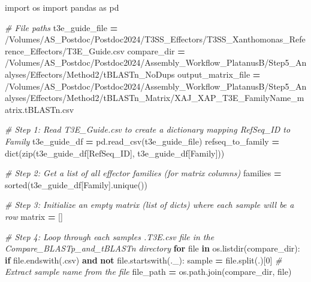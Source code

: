 \documentclass[
]{book}
\newenvironment{Shaded}{\begin{snugshade}}{\end{snugshade}}
\newcommand{\BuiltInTok}[1]{#1}
\newcommand{\CommentTok}[1]{\textcolor[rgb]{0.56,0.35,0.01}{\textit{#1}}}
\newcommand{\ControlFlowTok}[1]{\textcolor[rgb]{0.13,0.29,0.53}{\textbf{#1}}}
\newcommand{\DecValTok}[1]{\textcolor[rgb]{0.00,0.00,0.81}{#1}}
\newcommand{\ImportTok}[1]{#1}
\newcommand{\KeywordTok}[1]{\textcolor[rgb]{0.13,0.29,0.53}{\textbf{#1}}}
\newcommand{\NormalTok}[1]{#1}
\newcommand{\OperatorTok}[1]{\textcolor[rgb]{0.81,0.36,0.00}{\textbf{#1}}}
\newcommand{\StringTok}[1]{\textcolor[rgb]{0.31,0.60,0.02}{#1}}
\begin{document}
\begin{Shaded}
\begin{Highlighting}[]
\ImportTok{import}\NormalTok{ os}
\ImportTok{import}\NormalTok{ pandas }\ImportTok{as}\NormalTok{ pd}

\CommentTok{\# File paths}
\NormalTok{t3e\_guide\_file }\OperatorTok{=} \StringTok{\textquotesingle{}/Volumes/AS\_Postdoc/Postdoc2024/T3SS\_Effectors/T3SS\_Xanthomonas\_Reference\_Effectors/T3E\_Guide.csv\textquotesingle{}}
\NormalTok{compare\_dir }\OperatorTok{=} \StringTok{\textquotesingle{}/Volumes/AS\_Postdoc/Postdoc2024/Assembly\_Workflow\_PlatanusB/Step5\_Analyses/Effectors/Method2/tBLASTn\_NoDups\textquotesingle{}}
\NormalTok{output\_matrix\_file }\OperatorTok{=} \StringTok{\textquotesingle{}/Volumes/AS\_Postdoc/Postdoc2024/Assembly\_Workflow\_PlatanusB/Step5\_Analyses/Effectors/Method2/tBLASTn\_Matrix/XAJ\_XAP\_T3E\_FamilyName\_matrix.tBLASTn.csv\textquotesingle{}}

\CommentTok{\# Step 1: Read T3E\_Guide.csv to create a dictionary mapping RefSeq\_ID to Family}
\NormalTok{t3e\_guide\_df }\OperatorTok{=}\NormalTok{ pd.read\_csv(t3e\_guide\_file)}
\NormalTok{refseq\_to\_family }\OperatorTok{=} \BuiltInTok{dict}\NormalTok{(}\BuiltInTok{zip}\NormalTok{(t3e\_guide\_df[}\StringTok{\textquotesingle{}RefSeq\_ID\textquotesingle{}}\NormalTok{], t3e\_guide\_df[}\StringTok{\textquotesingle{}Family\textquotesingle{}}\NormalTok{]))}

\CommentTok{\# Step 2: Get a list of all effector families (for matrix columns)}
\NormalTok{families }\OperatorTok{=} \BuiltInTok{sorted}\NormalTok{(t3e\_guide\_df[}\StringTok{\textquotesingle{}Family\textquotesingle{}}\NormalTok{].unique())}

\CommentTok{\# Step 3: Initialize an empty matrix (list of dicts) where each sample will be a row}
\NormalTok{matrix }\OperatorTok{=}\NormalTok{ []}

\CommentTok{\# Step 4: Loop through each sample\textquotesingle{}s .T3E.csv file in the Compare\_BLASTp\_and\_tBLASTn directory}
\ControlFlowTok{for} \BuiltInTok{file} \KeywordTok{in}\NormalTok{ os.listdir(compare\_dir):}
    \ControlFlowTok{if} \BuiltInTok{file}\NormalTok{.endswith(}\StringTok{\textquotesingle{}.csv\textquotesingle{}}\NormalTok{) }\KeywordTok{and} \KeywordTok{not} \BuiltInTok{file}\NormalTok{.startswith(}\StringTok{\textquotesingle{}.\_\textquotesingle{}}\NormalTok{):}
\NormalTok{        sample }\OperatorTok{=} \BuiltInTok{file}\NormalTok{.split(}\StringTok{\textquotesingle{}.\textquotesingle{}}\NormalTok{)[}\DecValTok{0}\NormalTok{]  }\CommentTok{\# Extract sample name from the file}
\NormalTok{        file\_path }\OperatorTok{=}\NormalTok{ os.path.join(compare\_dir, }\BuiltInTok{file}\NormalTok{)}
        

\end{Highlighting}
\end{Shaded}
\end{document}

